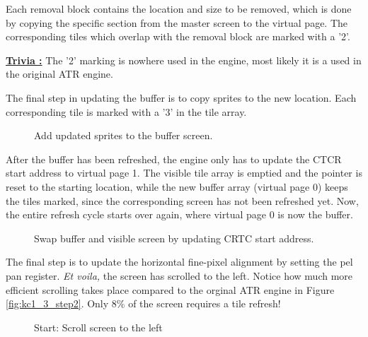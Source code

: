 \documentclass[book.tex]{subfiles}
\begin{document}
\par
Each removal block contains the location and size to be removed, which is done by copying the specific section from the master screen to the virtual page. The corresponding tiles which overlap with the removal block are marked with a '2'.\\

\par
\textbf{\underline{Trivia :}} The '2' marking is nowhere used in the engine, most likely it is a used in the original ATR engine.\\
  \par
  
\par
The final step in updating the buffer is to copy sprites to the new location. Each corresponding tile is marked with a '3' in the tile array.

\begin{figure}[H]
\centering
 \caption{Add updated sprites to the buffer screen.}
 \label{fig:kc4_6_step4}
\end{figure}

\pagebreak

After the buffer has been refreshed, the engine only has to update the CTCR start address to virtual page 1. The visible tile array is emptied and the pointer is reset to the starting location, while the new buffer array (virtual page 0) keeps the tiles marked, since the corresponding screen has not been refreshed yet. Now, the entire refresh cycle starts over again, where virtual page 0 is now the buffer.


\begin{figure}[H]
\centering
 \caption{Swap buffer and visible screen by updating CRTC start address.}
 \label{fig:kc4_6_step4}
\end{figure}

\pagebreak

The final step is to update the horizontal fine-pixel alignment by setting the pel pan register. \textit{Et voila,} the screen has scrolled to the left. Notice how much more efficient scrolling takes place compared to the orginal ATR engine in Figure \ref{fig:kc1_3_step2}. Only 8\% of the screen requires a tile refresh!\\
\begin{figure}[H]
\centering
 \caption{Start: Scroll screen to the left}
 \label{fig:kc4_6_start}
\end{figure}
\end{document}
